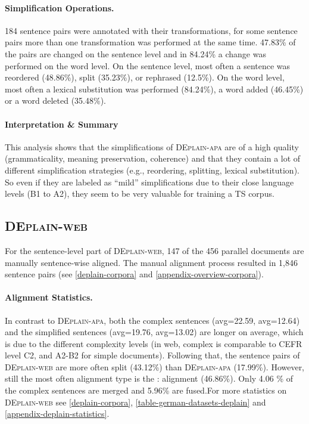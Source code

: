 \documentclass[11pt]{article}
\begin{document}
\paragraph{Simplification Operations.}
184 sentence pairs were annotated with their transformations, for some sentence pairs more than one transformation was performed at the same time. 47.83\% of the pairs are changed on the sentence level and in 84.24\% a change was performed on the word level. On the sentence level, most often a sentence was reordered (48.86\%), split (35.23\%), or rephrased (12.5\%). On the word level, most often a lexical substitution was performed (84.24\%), a word added (46.45\%) or a word deleted (35.48\%). 



\paragraph{Interpretation \& Summary}
This analysis shows that the simplifications of \textsc{DEplain-apa} are of a high quality (grammaticality, meaning preservation, coherence) and that they contain a lot of different simplification strategies (e.g., reordering, splitting, lexical substitution). So even if they are labeled as ``mild'' simplifications due to their close language levels (B1 to A2), they seem to be very valuable for training a TS corpus.



\subsection{\textsc{DEplain-web}}
\label{sec-deplain-web-sent}
For the sentence-level part of \textsc{DEplain-web}, 147 of the 456 parallel documents are manually sentence-wise aligned. The manual alignment process resulted in 1,846 sentence pairs 
(see \autoref{deplain-corpora} and \autoref{appendix-overview-corpora}).


\paragraph{Alignment Statistics.}
In contrast to \textsc{DEplain-apa}, both the complex sentences (avg=22.59, avg=12.64) and the simplified sentences (avg=19.76, avg=13.02) are longer on average, which is due to the different complexity levels (in web, complex is comparable to CEFR level C2, and A2-B2 for simple documents). Following that, the sentence pairs of \textsc{DEplain-web} are more often split (43.12\%) than \textsc{DEplain-apa} (17.99\%). However, still the most often alignment type is the : alignment (46.86\%). Only 4.06 \% of the complex sentences are merged and 5.96\% are fused.For more statistics on \textsc{DEplain-web} see \autoref{deplain-corpora},  \autoref{table-german-datasets-deplain} and \autoref{appendix-deplain-statistics}.
\end{document}
